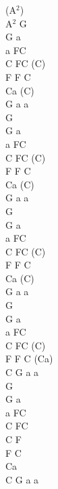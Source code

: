 \documentclass[a5paper, 10pt]{book}
\begin{document}
\begin{minipage}[t]{0.3\textwidth}
  (A$^2$)\\
  A$^2$ G \\
  G a\\
  a FC\\
  C FC (C)\\
  F F C\\
  Ca (C)\\
  G a a\\

  G \\
  G a\\
  a FC\\
  C FC (C)\\
  F F C\\
  Ca (C)\\
  G a a\\

  G \\
  G a\\
  a FC\\
  C FC (C)\\
  F F C\\
  Ca (C)\\
  G a a\\

   G \\
  G a\\
  a FC\\
  C FC (C)\\
  F F C (Ca)\\
  C G a a\\

  G \\
  G a\\
  a FC\\
  C FC\\
  C F\\
  F C\\
  Ca\\
  C G a a\\

\end{minipage}

\newpage
\end{document}
